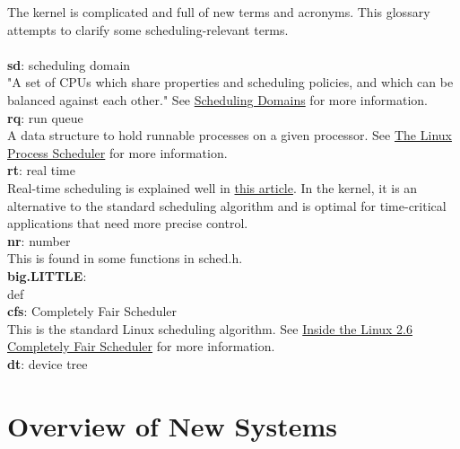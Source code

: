 \documentclass{article}
\begin{document}
The kernel is complicated and full of new terms and acronyms. This glossary attempts to clarify some scheduling-relevant terms.
\\ 
\\
\textbf{sd}: scheduling domain
\\
"A set of CPUs which share properties and scheduling policies, and which can be balanced against each other." See \href{https://lwn.net/Articles/80911/}{Scheduling Domains} for more information.
\\ 
\newline
\textbf{rq}: run queue
\\
A data structure to hold runnable processes on a given processor. See \href{http://www.informit.com/articles/article.aspx?p=101760&seqNum=2}{The Linux Process Scheduler} for more information.
\\ 
\newline
\textbf{rt}: real time
\\
Real-time scheduling is explained well in \href{http://web.cs.ucla.edu/classes/winter17/cs111/readings/realtime.html}{this article}. In the kernel, it is an alternative to the standard scheduling algorithm and is optimal for time-critical applications that need more precise control.
\\ 
\newline
\textbf{nr}: number
\\
This is found in some functions in sched.h.
\\ 
\newline
\textbf{big.LITTLE}: 
\\
def
\\ 
\newline
\textbf{cfs}: Completely Fair Scheduler
\\
This is the standard Linux scheduling algorithm. See \href{https://www.ibm.com/developerworks/library/l-completely-fair-scheduler/}{Inside the Linux 2.6 Completely Fair Scheduler} for more information.
\\ \newline
\textbf{dt}: device tree
\\


\section{Overview of New Systems}
\end{document}
